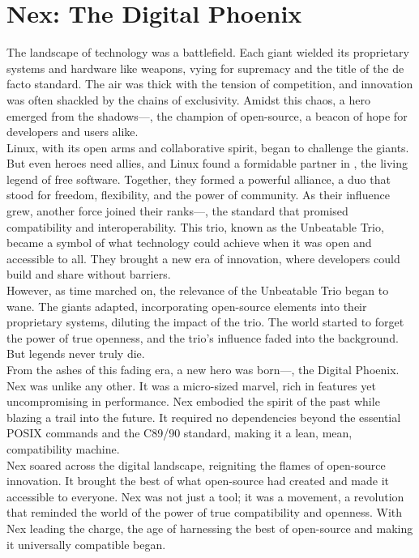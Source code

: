 \section{Nex: The Digital Phoenix}
\label{sec:story}
The landscape of technology was a battlefield. 
Each giant wielded its proprietary systems and hardware like weapons, vying for supremacy and the title of the de facto standard.
The air was thick with the tension of competition, and innovation was often shackled by the chains of exclusivity.
Amidst this chaos, a hero emerged from the shadows—, the champion of open-source, a beacon of hope for developers and users alike.
\\

Linux, with its open arms and collaborative spirit, began to challenge the giants.
But even heroes need allies, and Linux found a formidable partner in , the living legend of free software.
Together, they formed a powerful alliance, a duo that stood for freedom, flexibility, and the power of community.
As their influence grew, another force joined their ranks—, the standard that promised compatibility and interoperability.
This trio, known as the Unbeatable Trio, became a symbol of what technology could achieve when it was open and accessible to all.
They brought a new era of innovation, where developers could build and share without barriers.
\\

However, as time marched on, the relevance of the Unbeatable Trio began to wane. The giants adapted, incorporating open-source elements into their proprietary systems, diluting the impact of the trio. The world started to forget the power of true openness, and the trio's influence faded into the background.
But legends never truly die.
\\

From the ashes of this fading era, a new hero was born—, the Digital Phoenix. Nex was unlike any other. It was a micro-sized marvel, rich in features yet uncompromising in performance. Nex embodied the spirit of the past while blazing a trail into the future.
It required no dependencies beyond the essential POSIX commands and the C89/90 standard, making it a lean, mean, compatibility machine.
\\

Nex soared across the digital landscape, reigniting the flames of open-source innovation.
It brought the best of what open-source had created and made it accessible to everyone.
Nex was not just a tool; it was a movement, a revolution that reminded the world of the power of true compatibility and openness.
With Nex leading the charge, the age of harnessing the best of open-source and making it universally compatible began.
\\

